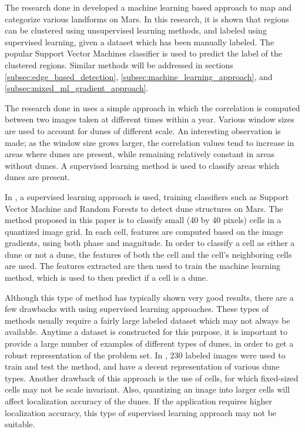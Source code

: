 The research done in \cite{2007_Machine_Learning_tools_automatic_mapping_mars} developed a machine learning based approach to map and categorize various landforms on Mars. In this research, it is shown that regions can be clustered using unsupervised learning methods, and labeled using supervised learning, given a dataset which has been manually labeled. The popular Support Vector Machines classifier is used to predict the label of the clustered regions. Similar methods will be addressed in sections \ref{subsec:edge_based_detection}, \ref{subsec:machine_learning_approach}, and \ref{subsec:mixed_ml_gradient_approach}.

The research done in \cite{2013_sar_image_automated_detection_dune_area} uses a simple approach in which the correlation is computed between two images taken at different times within a year. Various window sizes are used to account for dunes of different scale. An interesting observation is made; as the window size grows larger, the correlation values tend to increase in areas where dunes are present, while remaining relatively constant in areas without dunes. A supervised learning method is used to classify areas which dunes are present.

In \cite{BandeiraMarques}, a supervised learning approach is used, training classifiers such as Support Vector Machine and Random Forests to detect dune structures on Mars. The method proposed in this paper is to classify small (40 by 40 pixels) cells in a quantized image grid. In each cell, features are computed based on the image gradients, using both phase and magnitude. In order to classify a cell as either a dune or not a dune, the features of both the cell and the cell's neighboring cells are used. The features extracted are then used to train the machine learning method, which is used to then predict if a cell is a dune.

Although this type of method has typically shown very good results, there are a few drawbacks with using supervised learning approaches. These types of methods usually require a fairly large labeled dataset which may not always be available. Anytime a dataset is constructed for this purpose, it is important to provide a large number of examples of different types of dunes, in order to get a robust representation of the problem set. In \cite{BandeiraMarques}, 230 labeled images were used to train and test the method, and have a decent representation of various dune types. Another drawback of this approach is the use of cells, for which fixed-sized cells may not be scale invariant. Also, quantizing an image into larger cells	will affect localization accuracy of the dunes. If the application requires higher localization accuracy, this type of supervised learning approach may not be suitable.

